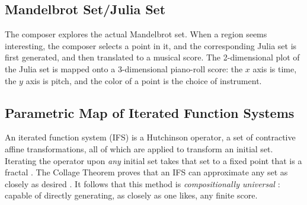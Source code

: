 \documentclass[11pt,papersize=a4]{scrartcl}
\begin{document}
\subsection*{Mandelbrot Set/Julia Set}

The composer explores the actual Mandelbrot set. When a region seems interesting, the composer selects a point in it, and the corresponding Julia set is first generated, and then translated to a musical score. The 2-dimensional plot of the Julia set is mapped onto a 3-dimensional piano-roll score: the $x$ axis is time, the $y$ axis is pitch, and the color of a point is the choice of instrument.

\subsection*{Parametric Map of Iterated Function Systems}

An iterated function system (IFS) is a Hutchinson operator, a set of contractive affine transformations, all of which are applied to transform an initial set. Iterating the operator upon \emph{any} initial set takes that set to a fixed point that is a fractal \parencite{barnsley1985iterated, barnsley1993}. The Collage Theorem proves that an IFS can approximate any set as closely as desired \parencite{barnsley1989fractal, barnsley1993}. It follows that this method is \emph{compositionally universal} \parencite{obsessed, gogins2023scoregraphs}: capable of directly generating, as closely as one likes, any finite score. 
\end{document}
